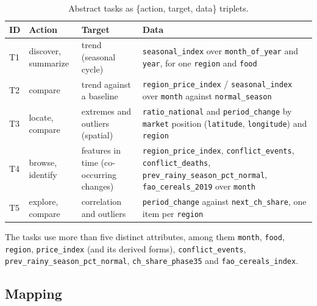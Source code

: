 \documentclass{article}
\begin{document}
\begin{table}[H]
  \centering
  \small
  \begin{tabularx}{\linewidth}{l l l X}
    \hline
    \textbf{ID} & \textbf{Action} & \textbf{Target} & \textbf{Data} \\
    \hline
    T1 & discover, summarize & trend (seasonal cycle) & \texttt{seasonal\_index} over \texttt{month\_of\_year} and \texttt{year}, for one \texttt{region} and \texttt{food} \\
    T2 & compare & trend against a baseline & \texttt{region\_price\_index} / \texttt{seasonal\_index} over \texttt{month} against \texttt{normal\_season} \\
    T3 & locate, compare & extremes and outliers (spatial) & \texttt{ratio\_national} and \texttt{period\_change} by \texttt{market} position (\texttt{latitude}, \texttt{longitude}) and \texttt{region} \\
    T4 & browse, identify & features in time (co-occurring changes) & \texttt{region\_price\_index}, \texttt{conflict\_events}, \texttt{conflict\_deaths}, \texttt{prev\_rainy\_season\_pct\_normal}, \texttt{fao\_cereals\_2019} over \texttt{month} \\
    T5 & explore, compare & correlation and outliers & \texttt{period\_change} against \texttt{next\_ch\_share}, one item per \texttt{region} \\
    \hline
  \end{tabularx}
  \caption{Abstract tasks as \{action, target, data\} triplets.}
  \label{tab:abstract}
\end{table}

The tasks use more than five distinct attributes, among them \texttt{month}, \texttt{food}, \texttt{region}, \texttt{price\_index} (and its derived forms), \texttt{conflict\_events}, \texttt{prev\_rainy\_season\_pct\_normal}, \texttt{ch\_share\_phase35} and \texttt{fao\_cereals\_index}.

\subsection{Mapping}
\end{document}
